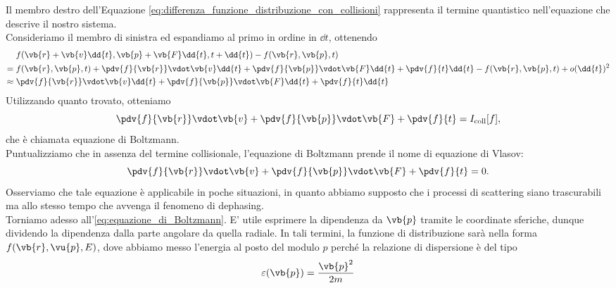 Il membro destro dell'Equazione \eqref{eq:differenza_funzione_distribuzione_con_collisioni} rappresenta il termine quantistico nell'equazione che descrive il nostro sistema.\\
Consideriamo il membro di sinistra ed espandiamo al primo in ordine in $\dd{t}$, ottenendo
\begin{equation*}
    \begin{split}
        & \hspace{0.1cm} f(\vb{r} + \vb{v} \dd{t}, \vb{p} + \vb{F} \dd{t}, t + \dd{t}) - f(\vb{r}, \vb{p}, t)
        \\
        = & \hspace{0.1cm} f(\vb{r}, \vb{p}, t) + \pdv{f}{\vb{r}} \vdot \vb{v} \dd{t} + \pdv{f}{\vb{p}} \vdot \vb{F} \dd{t} + \pdv{f}{t} \dd{t} - f(\vb{r}, \vb{p}, t) +o{(\dd{t})^2}
        \\
        \approx & \hspace{0.1cm} \pdv{f}{\vb{r}} \vdot \vb{v} \dd{t} + \pdv{f}{\vb{p}} \vdot \vb{F} \dd{t} + \pdv{f}{t} \dd{t}
    \end{split}
\end{equation*}
Utilizzando quanto trovato, otteniamo
\begin{equation}
    \pdv{f}{\vb{r}} \vdot \vb{v} + \pdv{f}{\vb{p}} \vdot \vb{F} + \pdv{f}{t}
    =I_{\rm coll}[f],
    \label{eq:equazione_di_Boltzmann}
\end{equation}
che è chiamata equazione di Boltzmann.\\
Puntualizziamo che in assenza del termine collisionale, l'equazione di Boltzmann prende il nome di equazione di Vlasov:
\begin{equation}
    \pdv{f}{\vb{r}} \vdot \vb{v} + \pdv{f}{\vb{p}} \vdot \vb{F} + \pdv{f}{t}
    =0.
    \label{eq:equazione_di_Vlasov}
\end{equation}
Osserviamo che tale equazione è applicabile in poche situazioni, in quanto abbiamo supposto che i processi di scattering siano trascurabili ma allo stesso tempo che avvenga il fenomeno di dephasing.\\
Torniamo adesso all'\eqref{eq:equazione_di_Boltzmann}. E' utile esprimere la dipendenza da $\vb{p}$ tramite le coordinate sferiche, dunque dividendo la dipendenza dalla parte angolare da quella radiale. In tali termini, la funzione di distribuzione sarà nella forma $f(\vb{r},\vu{p},E)$, dove abbiamo messo l'energia al posto del modulo $p$ perché la relazione di dispersione è del tipo
\begin{equation*}
    \varepsilon(\vb{p})=
    \frac{\vb{p}^2}{2m}
\end{equation*}
